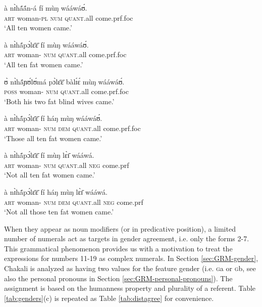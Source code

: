 \begin{exe}
\begin{exe}
\begin{exe}
{\begin{exe}
\begin{exe}
\begin{exe}
\begin{exe}
\begin{exe}
\begin{exe}
\begin{exe}
\begin{exe}
\begin{exe}
 \ex\label{ex:all-ten-w}
\gll à nɪ̀hã́ã́n-á fí mùŋ wááwáʊ́.\\
\textsc{art} {woman-\textsc{pl}} \textsc{num} \textsc{quant}.all come.{\sc prf.foc}\\
\glt `All ten women came.'

\ex\label{ex:all-fat-ten-w}
\gll  à nɪ̀hã́pɔ́lɛ̄ɛ̄ fí mùŋ wááwáʊ́.\\
\textsc{art} {woman-\qual} \textsc{num} \textsc{quant}.all come.{\sc prf.foc}\\ 
\glt `All ten fat women came.'

\ex\label{ex:all-fat-blind-two-w}
\gll ʊ̀ nɪ̀hã́ɲʊ́lʊ́má pɔ̀lɛ̄ɛ̄  bàlɪ́ɛ́ mùŋ  wááwáʊ́.\\
\textsc{poss} {woman-\qual}  {\qual} \textsc{num} 
\textsc{quant}.all  come.{\sc prf.foc}\\ 
\glt `Both his two fat blind wives came.'

\ex\label{ex:all-fat-ten-w-those}
\gll  à nɪ̀hã́pɔ́lɛ̄ɛ̄ fí háŋ mùŋ wááwáʊ́.\\
\textsc{art} {woman-\qual} \textsc{num}  \textsc{dem} \textsc{quant}.all
  come.{\sc prf.foc}\\ 
\glt `Those all ten fat women came.'


\ex\label{ex:all-fat-ten-w-n}
\gll à nɪ̀hã́pɔ́lɛ̄ɛ̄ fí mùŋ lɛ̀ɪ̄ wááwá.\\
\textsc{art} {woman-\qual} \textsc{num} \textsc{quant}.all
\textsc{neg}  come.{\sc prf}  \\
\glt `Not all ten fat women came.'

 \ex\label{ex:full-temp}
\gll à nɪ̀hã́pɔ́lɛ̄ɛ̄ fí háŋ mùŋ  lɛ̀ɪ̄ wááwá. \\
\textsc{art} {woman-\qual}  \textsc{num}   \textsc{dem}  \textsc{quant}.all
\textsc{neg}   come.{\sc prf} \\
\glt `Not all those ten fat  women came.'

\z
\z

When they appear as noun modifiers  (or in predicative position),  a limited
number of numerals act as targets in gender agreement, i.e. only the forms 2-7. 
 This grammatical
phenomenon provides us with a  motivation to treat  the expressions for numbers
11-19 as complex numerals.
In Section \ref{sec:GRM-gender},  Chakali is analyzed as having two values for
the
feature gender (i.e. \textsc{g}{\sls a} or \textsc{g}{\sls b}, see also the personal pronouns in  
Section 
\ref{sec:GRM-personal-pronouns}). The assignment is based on the humanness 
property and
plurality of a referent.  Table \ref{tab:genders}(c) is repeated as Table 
\ref{tab:distagree} for convenience. 



\end{exe}
\end{exe}
\end{exe}
\end{exe}
\end{exe}
\end{exe}
\end{exe}
\end{exe}
\end{exe}}
\end{exe}
\end{exe}
\end{exe}
